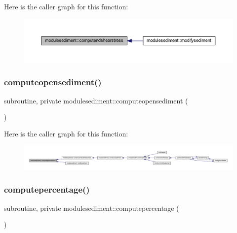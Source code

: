 Here is the caller graph for this function\+:\nopagebreak
\begin{figure}[H]
\begin{center}
\leavevmode
\includegraphics[width=350pt]{namespacemodulesediment_a9d78e985794a27f527367cd42c5dafb2_icgraph}
\end{center}
\end{figure}
\mbox{\label{namespacemodulesediment_a3b7a3bb199cbac91d1df5c84bbd12194}} 
\subsubsection{\texorpdfstring{computeopensediment()}{computeopensediment()}}
{\footnotesize\ttfamily subroutine, private modulesediment\+::computeopensediment (\begin{DoxyParamCaption}{ }\end{DoxyParamCaption})\hspace{0.3cm}{\ttfamily [private]}}

Here is the caller graph for this function\+:\nopagebreak
\begin{figure}[H]
\begin{center}
\leavevmode
\includegraphics[width=350pt]{namespacemodulesediment_a3b7a3bb199cbac91d1df5c84bbd12194_icgraph}
\end{center}
\end{figure}
\mbox{\label{namespacemodulesediment_a967461a16889fe7be50495dad90a178a}} 
\subsubsection{\texorpdfstring{computepercentage()}{computepercentage()}}
{\footnotesize\ttfamily subroutine, private modulesediment\+::computepercentage (\begin{DoxyParamCaption}{ }\end{DoxyParamCaption})\hspace{0.3cm}{\ttfamily [private]}}

